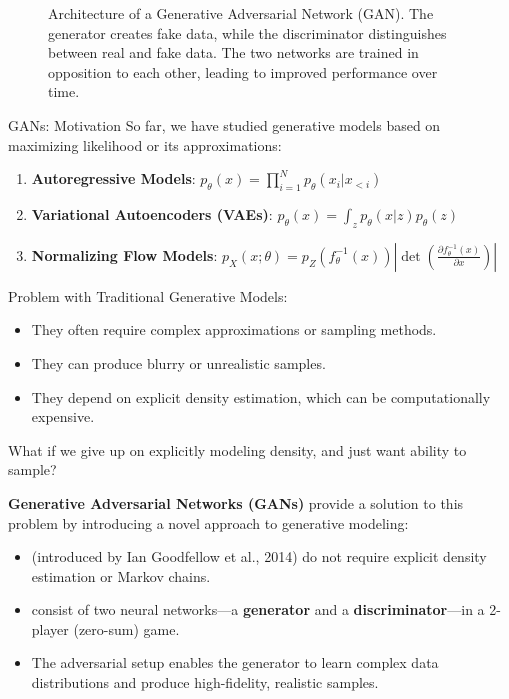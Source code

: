 \begin{frame}[allowframebreaks]{}
    \begin{figure}
        \centering
        \caption*{Architecture of a Generative Adversarial Network (GAN). The generator creates fake data, while the discriminator distinguishes between real and fake data. The two networks are trained in opposition to each other, leading to improved performance over time.}
    \end{figure}
\end{frame}

\begin{frame}[allowframebreaks]{GANs: Motivation}
So far, we have studied generative models based on maximizing likelihood or its approximations:
\begin{enumerate}
    \item \textbf{Autoregressive Models}: $p_\theta(x) = \prod^N_{i=1} p_\theta(x_i|x_{<i})$
    \item \textbf{Variational Autoencoders (VAEs)}: $p_\theta(x) = \int_z p_\theta(x|z) p_\theta(z)$
    \item \textbf{Normalizing Flow Models}: $p_X(x;\theta) = p_Z(f_\theta^{-1}(x)) \left | \det \left( \frac{\partial f_\theta^{-1}(x)}{\partial x} \right )\right |$
\end{enumerate}

\begin{block}{Problem with Traditional Generative Models:}
    \begin{itemize}
        \item They often require complex approximations or sampling methods.
        \item They can produce blurry or unrealistic samples.
        \item They depend on explicit density estimation, which can be computationally expensive.
    \end{itemize}
\end{block}

What if we give up on explicitly modeling density, and just want
ability to sample?

\framebreak

\textbf{Generative Adversarial Networks (GANs)} provide a solution to this problem by introducing a novel approach to generative modeling:
\begin{itemize}
    \item (introduced by Ian Goodfellow et al., 2014) do not require explicit density estimation or Markov chains.
    \item consist of two neural networks—a \textbf{generator} and a \textbf{discriminator}—in a 2-player (zero-sum) game.
    \item The adversarial setup enables the generator to learn complex data distributions and produce high-fidelity, realistic samples.
\end{itemize}

\end{frame}

